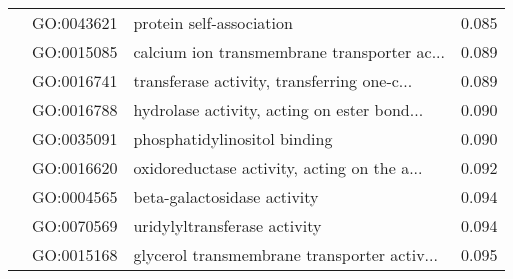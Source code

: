 \begin{longtable}{lllr}
   & GO:0043621 &                     protein self-association &         0.085 \\
   & GO:0015085 &  calcium ion transmembrane transporter ac... &         0.089 \\
   & GO:0016741 &  transferase activity, transferring one-c... &         0.089 \\
   & GO:0016788 &  hydrolase activity, acting on ester bond... &         0.090 \\
   & GO:0035091 &                 phosphatidylinositol binding &         0.090 \\
   & GO:0016620 &  oxidoreductase activity, acting on the a... &         0.092 \\
   & GO:0004565 &                  beta-galactosidase activity &         0.094 \\
   & GO:0070569 &                 uridylyltransferase activity &         0.094 \\
   & GO:0015168 &  glycerol transmembrane transporter activ... &         0.095 \\
\end{longtable}
